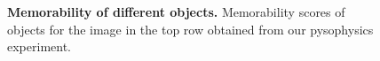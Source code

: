 \begin{figure}[t]
\centering
{} 

\vspace{-3mm}

\vspace{-5mm}\caption{\footnotesize\textbf{Memorability of different objects.} Memorability scores of objects for the image in the top row obtained from our pysophysics experiment. }\label{fig:introPhoto}
\end{figure}

%

